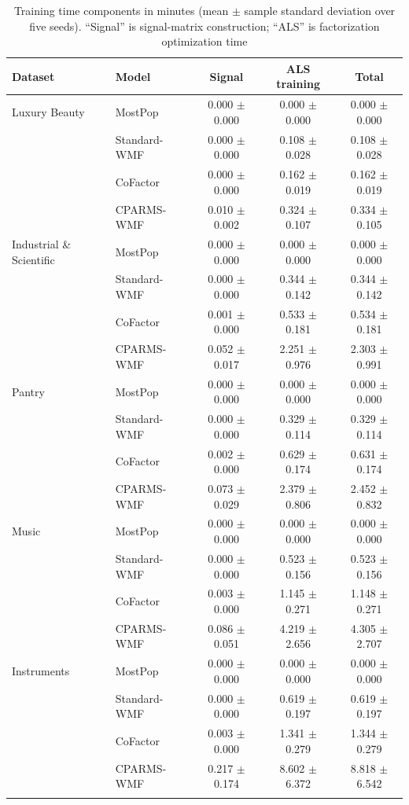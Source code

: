 \documentclass[pdflatex,sn-vancouver-num]{sn-jnl}%
\theoremstyle{thmstyleone}%
\theoremstyle{thmstyletwo}%
\theoremstyle{thmstylethree}%
\begin{document}
\begin{table}
\centering
\caption{Training time components in minutes (mean $\pm$ sample standard deviation over five
seeds). ``Signal'' is signal-matrix construction; ``ALS'' is factorization
optimization time}
\label{tab:runtime}
\small
\renewcommand{\arraystretch}{1.15}
\begin{tabular*}{\textheight}{@{\extracolsep{\fill}}llccc@{}}
\toprule
Dataset & Model & Signal & ALS training & Total \\
\midrule
Luxury Beauty & MostPop & 0.000 $\pm$ 0.000 & 0.000 $\pm$ 0.000 & 0.000 $\pm$ 0.000 \\
              & Standard-WMF & 0.000 $\pm$ 0.000 & 0.108 $\pm$ 0.028 & 0.108 $\pm$ 0.028 \\
              & CoFactor & 0.000 $\pm$ 0.000 & 0.162 $\pm$ 0.019 & 0.162 $\pm$ 0.019 \\
              & CPARMS-WMF & 0.010 $\pm$ 0.002 & 0.324 $\pm$ 0.107 & 0.334 $\pm$ 0.105 \\
\midrule
Industrial \& Scientific & MostPop & 0.000 $\pm$ 0.000 & 0.000 $\pm$ 0.000 & 0.000 $\pm$ 0.000 \\
              & Standard-WMF & 0.000 $\pm$ 0.000 & 0.344 $\pm$ 0.142 & 0.344 $\pm$ 0.142 \\
              & CoFactor & 0.001 $\pm$ 0.000 & 0.533 $\pm$ 0.181 & 0.534 $\pm$ 0.181 \\
              & CPARMS-WMF & 0.052 $\pm$ 0.017 & 2.251 $\pm$ 0.976 & 2.303 $\pm$ 0.991 \\
\midrule
Pantry        & MostPop & 0.000 $\pm$ 0.000 & 0.000 $\pm$ 0.000 & 0.000 $\pm$ 0.000 \\
              & Standard-WMF & 0.000 $\pm$ 0.000 & 0.329 $\pm$ 0.114 & 0.329 $\pm$ 0.114 \\
              & CoFactor & 0.002 $\pm$ 0.000 & 0.629 $\pm$ 0.174 & 0.631 $\pm$ 0.174 \\
              & CPARMS-WMF & 0.073 $\pm$ 0.029 & 2.379 $\pm$ 0.806 & 2.452 $\pm$ 0.832 \\
\midrule
Music         & MostPop & 0.000 $\pm$ 0.000 & 0.000 $\pm$ 0.000 & 0.000 $\pm$ 0.000 \\
              & Standard-WMF & 0.000 $\pm$ 0.000 & 0.523 $\pm$ 0.156 & 0.523 $\pm$ 0.156 \\
              & CoFactor & 0.003 $\pm$ 0.000 & 1.145 $\pm$ 0.271 & 1.148 $\pm$ 0.271 \\
              & CPARMS-WMF & 0.086 $\pm$ 0.051 & 4.219 $\pm$ 2.656 & 4.305 $\pm$ 2.707 \\
\midrule
Instruments   & MostPop & 0.000 $\pm$ 0.000 & 0.000 $\pm$ 0.000 & 0.000 $\pm$ 0.000 \\
              & Standard-WMF & 0.000 $\pm$ 0.000 & 0.619 $\pm$ 0.197 & 0.619 $\pm$ 0.197 \\
              & CoFactor & 0.003 $\pm$ 0.000 & 1.341 $\pm$ 0.279 & 1.344 $\pm$ 0.279 \\
              & CPARMS-WMF & 0.217 $\pm$ 0.174 & 8.602 $\pm$ 6.372 & 8.818 $\pm$ 6.542 \\
\botrule
\end{tabular*}
\end{table}
\end{document}
